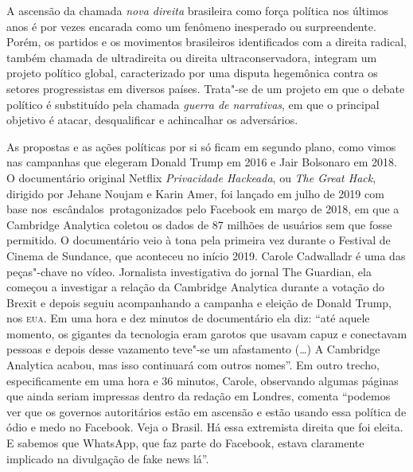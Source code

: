 
\begin{flushright}
\end{flushright}

\noindent{}A ascensão da chamada \textit{nova direita} brasileira como força política
nos últimos anos é por vezes encarada como um fenômeno inesperado ou
surpreendente. Porém, os partidos e os movimentos brasileiros
identificados com a direita radical, também chamada de ultradireita ou
direita ultraconservadora, integram um projeto político global,
caracterizado por uma disputa hegemônica contra os setores progressistas
em diversos países. Trata"-se de um projeto em que o debate político é
substituído pela chamada \textit{guerra de narrativas}, em que o principal
objetivo é atacar, desqualificar e achincalhar os adversários.

As propostas e as ações políticas por si só ficam em segundo plano, como
vimos nas campanhas que elegeram Donald Trump em 2016 e Jair Bolsonaro
em 2018. O documentário original Netflix \textit{Privacidade Hackeada}, ou \textit{The Great
Hack}, dirigido por Jehane Noujam e Karin Amer, foi lançado em julho de
2019 com base nos~escândalos~protagonizados pelo Facebook em março de
2018, em que a Cambridge Analytica coletou os dados de 87 milhões de
usuários sem que fosse permitido. O documentário veio à tona pela
primeira vez durante o Festival de Cinema de Sundance, que aconteceu no
início 2019. Carole Cadwalladr é uma das peças"-chave no vídeo.
Jornalista investigativa do jornal The Guardian, ela começou a
investigar a relação da Cambridge Analytica durante a votação do Brexit
e depois seguiu acompanhando a campanha e eleição de Donald Trump, nos
\textsc{eua}. Em uma hora e dez minutos de documentário ela diz: ``até aquele
momento, os gigantes da tecnologia eram garotos que usavam capuz e
conectavam pessoas e depois desse vazamento teve"-se um afastamento (\ldots{})
A Cambridge Analytica acabou, mas isso continuará com outros nomes''. Em
outro trecho, especificamente em uma hora e 36 minutos, Carole, observando algumas páginas que ainda seriam impressas dentro da
redação em Londres, comenta ``podemos ver que os governos autoritários
estão em ascensão e estão usando essa política de ódio e medo no
Facebook. Veja o Brasil. Há essa extremista direita que foi eleita. E
sabemos que WhatsApp, que faz parte do Facebook, estava claramente
implicado na divulgação de fake news lá''.


